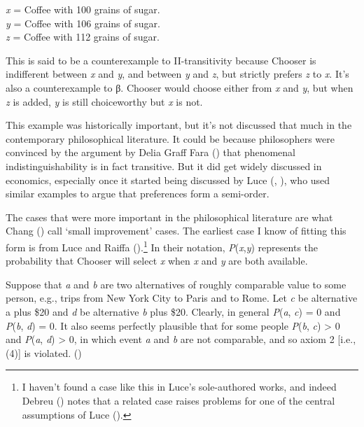 \documentclass[
  10.5pt,
  twoside]{article}
\renewenvironment{quote}
  {\vskip 5pt%
   \list{}{
    \setlength{\listparindent}{.25in}
    \setlength{\leftmargin}{.25in}
    \setlength{\rightmargin}{\leftmargin}
    \setlength{\parsep}{0in plus 0in minus 0in}
    }
    \item\relax
    \let\item\relax}
  {\endlist\vskip 5pt}
\begin{document}
\begin{quote}
\emph{x} = Coffee with 100 grains of sugar.\\
\emph{y} = Coffee with 106 grains of sugar.\\
\emph{z} = Coffee with 112 grains of sugar.
\end{quote}

This is said to be a counterexample to II-transitivity because Chooser
is indifferent between \emph{x} and \emph{y}, and between \emph{y} and
\emph{z}, but strictly prefers \emph{z} to \emph{x}. It's also a
counterexample to β. Chooser would choose either from \emph{x} and
\emph{y}, but when \emph{z} is added, \emph{y} is still choiceworthy but
\emph{x} is not.

This example was historically important, but it's not discussed that
much in the contemporary philosophical literature. It could be because
philosophers were convinced by the argument by Delia Graff Fara
() that phenomenal indistinguishability is
in fact transitive. But it did get widely discussed in economics,
especially once it started being discussed by Luce
(, ), who used
similar examples to argue that preferences form a semi-order.

The cases that were more important in the philosophical literature are
what Chang () call `small improvement'
cases. The earliest case I know of fitting this form is from Luce and
Raiffa ().\footnote{I haven't found a
  case like this in Luce's sole-authored works, and indeed Debreu
  () notes that a related case raises
  problems for one of the central assumptions of Luce
  ().} In their notation,
\emph{P}(\emph{x},\emph{y}) represents the probability that Chooser will
select \emph{x} when \emph{x} and \emph{y} are both available.

\begin{quote}
Suppose that \emph{a} and \emph{b} are two alternatives of roughly
comparable value to some person, e.g., trips from New York City to Paris
and to Rome. Let \emph{c} be alternative a plus \$20 and \emph{d} be
alternative \emph{b} plus \$20. Clearly, in general \emph{P}(\emph{a},
\emph{c}) = 0 and \emph{P}(\emph{b}, \emph{d}) = 0. It also seems
perfectly plausible that for some people \emph{P}(\emph{b}, \emph{c})
\textgreater{} 0 and \emph{P}(\emph{a}, \emph{d}) \textgreater{} 0, in
which event \emph{a} and \emph{b} are not comparable, and so axiom 2
{[}i.e., (4){]} is violated. ()
\end{quote}
\end{document}
